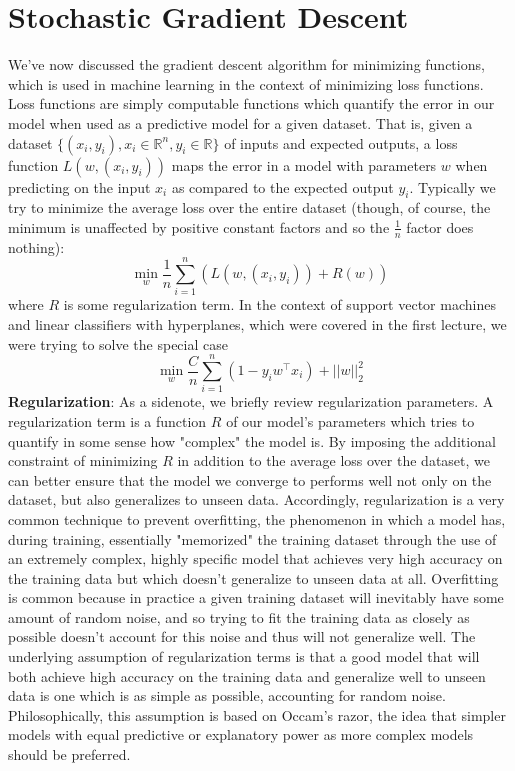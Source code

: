 \documentclass{article}
\begin{document}
\section{Stochastic Gradient Descent}
We've now discussed the gradient descent algorithm for minimizing functions, which is used in machine learning in the context of minimizing loss functions. Loss functions are simply computable functions which quantify the error in our model when used as a predictive model for a given dataset. That is, given a dataset $ \{ (x_i, y_i), x_i \in \mathbb{R}^n, y_i \in \mathbb{R} \} $ of inputs and expected outputs, a loss function $ L(w, (x_i, y_i)) $ maps the error in a model with parameters $ w $ when predicting on the input $ x_i $ as compared to the expected output $ y_i $.
\newline
Typically we try to minimize the average loss over the entire dataset (though, of course, the minimum is unaffected by positive constant factors and so the $ \frac{1}{n} $ factor does nothing):
$$ \min_w \frac{1}{n} \sum_{i = 1}^n (L(w, (x_i, y_i)) + R(w)) $$
where $ R $ is some regularization term. In the context of support vector machines and linear classifiers with hyperplanes, which were covered in the first lecture, we were trying to solve the special case
$$ \min_w \frac{C}{n} \sum_{i = 1}^n (1 - y_i w^{\intercal} x_i) + ||w||_2^2 $$
\textbf{Regularization}: As a sidenote, we briefly review regularization parameters. A regularization term is a function $ R $ of our model's parameters which tries to quantify in some sense how "complex" the model is. By imposing the additional constraint of minimizing $ R $ in addition to the average loss over the dataset, we can better ensure that the model we converge to performs well not only on the dataset, but also generalizes to unseen data. Accordingly, regularization is a very common technique to prevent overfitting, the phenomenon in which a model has, during training, essentially "memorized" the training dataset through the use of an extremely complex, highly specific model that achieves very high accuracy on the training data but which doesn't generalize to unseen data at all. Overfitting is common because in practice a given training dataset will inevitably have some amount of random noise, and so trying to fit the training data as closely as possible doesn't account for this noise and thus will not generalize well. The underlying assumption of regularization terms is that a good model that will both achieve high accuracy on the training data and generalize well to unseen data is one which is as simple as possible, accounting for random noise. Philosophically, this assumption is based on Occam's razor, the idea that simpler models with equal predictive or explanatory power as more complex models should be preferred.
\end{document}
